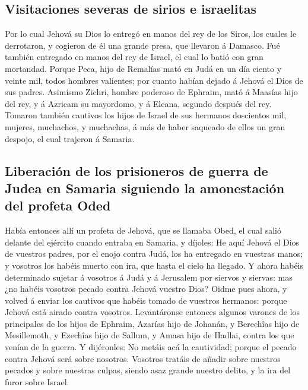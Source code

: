 \hypertarget{visitaciones-severas-de-sirios-e-israelitas}{%
\subsection{Visitaciones severas de sirios e
israelitas}\label{visitaciones-severas-de-sirios-e-israelitas}}

 Por lo cual Jehová su Dios lo entregó en manos del rey de
los Siros, los cuales le derrotaron, y cogieron de él una grande presa,
que llevaron á Damasco. Fué también entregado en manos del rey de
Israel, el cual lo batió con gran mortandad.  Porque Peca,
hijo de Remalías mató en Judá en un día ciento y veinte mil, todos
hombres valientes; por cuanto habían dejado á Jehová el Dios de sus
padres.  Asimismo Zichri, hombre poderoso de Ephraim, mató
á Maasías hijo del rey, y á Azricam su mayordomo, y á Elcana, segundo
después del rey.  Tomaron también cautivos los hijos de
Israel de sus hermanos doscientos mil, mujeres, muchachos, y muchachas,
á más de haber saqueado de ellos un gran despojo, el cual trajeron á
Samaria.

\hypertarget{liberaciuxf3n-de-los-prisioneros-de-guerra-de-judea-en-samaria-siguiendo-la-amonestaciuxf3n-del-profeta-oded}{%
\subsection{Liberación de los prisioneros de guerra de Judea en Samaria
siguiendo la amonestación del profeta
Oded}\label{liberaciuxf3n-de-los-prisioneros-de-guerra-de-judea-en-samaria-siguiendo-la-amonestaciuxf3n-del-profeta-oded}}

 Había entonces allí un profeta de Jehová, que se llamaba
Obed, el cual salió delante del ejército cuando entraba en Samaria, y
díjoles: He aquí Jehová el Dios de vuestros padres, por el enojo contra
Judá, los ha entregado en vuestras manos; y vosotros los habéis muerto
con ira, que hasta el cielo ha llegado.  Y ahora habéis
determinado sujetar á vosotros á Judá y á Jerusalem por siervos y
siervas: mas ¿no habéis vosotros pecado contra Jehová vuestro Dios?
 Oidme pues ahora, y volved á enviar los cautivos que
habéis tomado de vuestros hermanos: porque Jehová está airado contra
vosotros.  Levantáronse entonces algunos varones de los
principales de los hijos de Ephraim, Azarías hijo de Johanán, y
Berechîas hijo de Mesillemoth, y Ezechîas hijo de Sallum, y Amasa hijo
de Hadlai, contra los que venían de la guerra.  Y
dijéronles: No metáis acá la cautividad; porque el pecado contra Jehová
será sobre nosotros. Vosotros tratáis de añadir sobre nuestros pecados y
sobre nuestras culpas, siendo asaz grande nuestro delito, y la ira del
furor sobre Israel.

